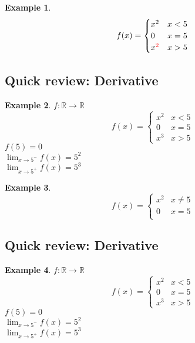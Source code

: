 \documentclass[twocolumn,20pt,fleqn]{extarticle}
\newcommand{\alert}[1]{{\color{red} #1}}
\theoremstyle{plain}
\theoremstyle{definition}
\newtheorem*{example}{Example}
\theoremstyle{remark}
\begin{document}
\begin{example}
  \[f(x) =
      \begin{cases}
        x^2 & x < 5\\
        0 & x = 5\\
       x^{\alert{2}} & x > 5
      \end{cases}
      \]
\end{example}


\clearpage



\subsection{Quick review: Derivative}
\begin{example}
  $f : \mathbb{R}\to \mathbb{R}$
  \[f(x) =
      \begin{cases}
        x^2 & x < 5\\
        0 & x = 5\\
        x^3 & x > 5
      \end{cases}
      \]
      $f(5)=0$\\
$\displaystyle\lim_{x \to 5^-} f(x)  = 5^2$\\
$\displaystyle\lim_{x \to 5^+} f(x)  = 5^3$
\end{example}


\begin{example}
  \[f(x) =
      \begin{cases}
        x^2 & x  \neq  5\\
        0 & x = 5\\
        
      \end{cases}
      \]
      
      


\end{example}


\clearpage



\subsection{Quick review: Derivative}
\begin{example}
  $f : \mathbb{R}\to \mathbb{R}$
  \[f(x) =
      \begin{cases}
        x^2 & x < 5\\
        0 & x = 5\\
        x^3 & x > 5
      \end{cases}
      \]
      $f(5)=0$\\
$\displaystyle\lim_{x \to 5^-} f(x)  = 5^2$\\
$\displaystyle\lim_{x \to 5^+} f(x)  = 5^3$
\end{example}
\end{document}

